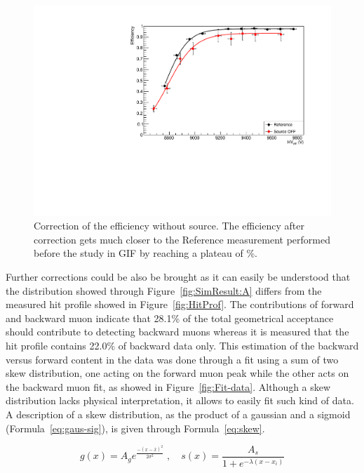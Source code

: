 	\begin{figure}[H]
            \centering
		\includegraphics[width = \plotwidth]{fig/chapt5/Compared-Efficiency-Correction.pdf}
		\caption{\label{fig:EffCorrection} Correction of the efficiency without source. The efficiency after correction gets much closer to the Reference measurement performed before the study in GIF by reaching a plateau of \%.}
	\end{figure}
	
	Further corrections could be also be brought as it can easily be understood that the distribution showed through Figure~\ref{fig:SimResult:A} differs from the measured hit profile showed in Figure~\ref{fig:HitProf}. The contributions of forward and backward muon indicate that 28.1\% of the total geometrical acceptance should contribute to detecting backward muons whereas it is measured that the hit profile contains 22.0\% of backward data only. This estimation of the backward versus forward content in the data was done through a fit using a sum of two skew distribution, one acting on the forward muon peak while the other acts on the backward muon fit, as showed in Figure~\ref{fig:Fit-data}. Although a skew distribution lacks physical interpretation, it allows to easily fit such kind of data. A description of a skew distribution, as the product of a gaussian and a sigmoid (Formula~\ref{eq:gaus-sig}), is given through Formula~\ref{eq:skew}.
	
	\begin{equation}
	\label{eq:gaus-sig}
	g(x) = A_g e^{\frac{-(x-\bar{x})^2}{2\sigma^2}}\; , \quad s(x) = \frac{A_s}{1+e^{-\lambda(x-x_i)}}
	\end{equation}
	

